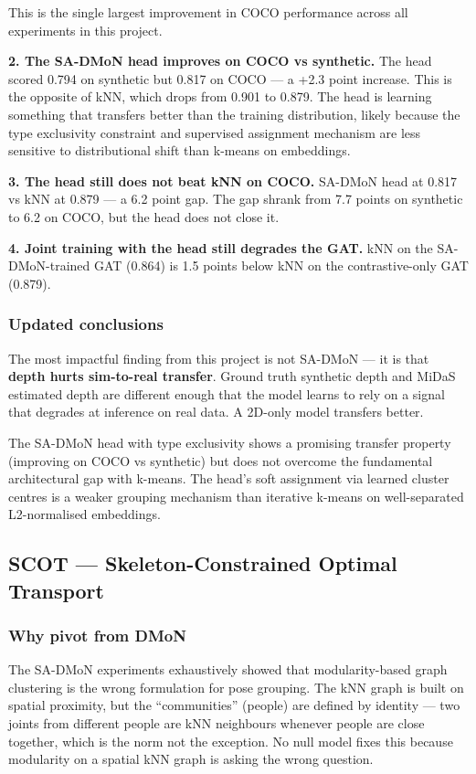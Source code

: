 This is the single largest improvement in COCO performance across all experiments in this project.

\textbf{2. The SA-DMoN head improves on COCO vs synthetic.} The head scored 0.794 on synthetic but 0.817 on COCO --- a +2.3 point increase. This is the opposite of kNN, which drops from 0.901 to 0.879. The head is learning something that transfers better than the training distribution, likely because the type exclusivity constraint and supervised assignment mechanism are less sensitive to distributional shift than k-means on embeddings.

\textbf{3. The head still does not beat kNN on COCO.} SA-DMoN head at 0.817 vs kNN at 0.879 --- a 6.2 point gap. The gap shrank from 7.7 points on synthetic to 6.2 on COCO, but the head does not close it.

\textbf{4. Joint training with the head still degrades the GAT.} kNN on the SA-DMoN-trained GAT (0.864) is 1.5 points below kNN on the contrastive-only GAT (0.879).


\subsubsection{Updated conclusions}

The most impactful finding from this project is not SA-DMoN --- it is that \textbf{depth hurts sim-to-real transfer}. Ground truth synthetic depth and MiDaS estimated depth are different enough that the model learns to rely on a signal that degrades at inference on real data. A 2D-only model transfers better.

The SA-DMoN head with type exclusivity shows a promising transfer property (improving on COCO vs synthetic) but does not overcome the fundamental architectural gap with k-means. The head's soft assignment via learned cluster centres is a weaker grouping mechanism than iterative k-means on well-separated L2-normalised embeddings.


\subsection{SCOT --- Skeleton-Constrained Optimal Transport}

\subsubsection{Why pivot from DMoN}

The SA-DMoN experiments exhaustively showed that modularity-based graph clustering is the wrong formulation for pose grouping. The kNN graph is built on spatial proximity, but the ``communities'' (people) are defined by identity --- two joints from different people are kNN neighbours whenever people are close together, which is the norm not the exception. No null model fixes this because modularity on a spatial kNN graph is asking the wrong question.

